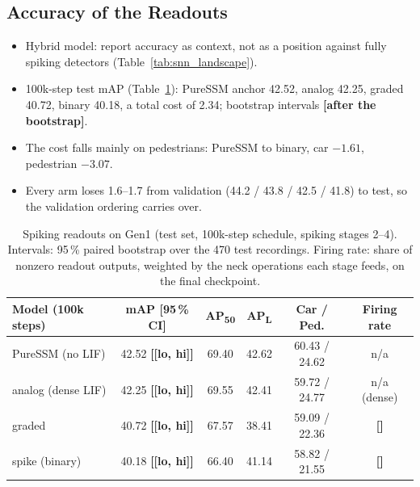 \documentclass[11pt, a4paper]{report}
\newcommand{\res}[1]{{\color{red}\textbf{[#1]}}}
\begin{document}
\subsection{Accuracy of the Readouts}
\label{subsec:spk_accuracy}
\begin{itemize}
  \item Hybrid model: report accuracy as context, not as a position against fully spiking detectors (Table~\ref{tab:snn_landscape}).
  \item 100k-step test mAP (Table~\ref{tab:spiking_ablation}): PureSSM anchor 42.52, analog 42.25, graded 40.72, binary 40.18, a total cost of 2.34; bootstrap intervals \res{after the bootstrap}.
  \item The cost falls mainly on pedestrians: PureSSM to binary, car $-1.61$, pedestrian $-3.07$.
  \item Every arm loses 1.6--1.7 from validation (44.2 / 43.8 / 42.5 / 41.8) to test, so the validation ordering carries over.
\end{itemize}
\begin{table}[htbp]
\centering
\caption{Spiking readouts on Gen1 (test set, 100k-step schedule, spiking stages 2--4). Intervals: 95\,\%
paired bootstrap over the 470 test recordings. Firing rate: share of nonzero readout outputs, weighted by the
neck operations each stage feeds, on the final checkpoint.}
\label{tab:spiking_ablation}
\begin{tabular}{lccccc}
\toprule
\textbf{Model (100k steps)} & \textbf{mAP [95\,\% CI]} & \textbf{AP\textsubscript{50}} & \textbf{AP\textsubscript{L}} & \textbf{Car / Ped.} & \textbf{Firing rate} \\
\midrule
PureSSM (no LIF)   & 42.52 \res{[lo, hi]} & 69.40 & 42.62 & 60.43 / 24.62 & n/a \\
analog (dense LIF) & 42.25 \res{[lo, hi]} & 69.55 & 42.41 & 59.72 / 24.77 & n/a (dense) \\
graded             & 40.72 \res{[lo, hi]} & 67.57 & 38.41 & 59.09 / 22.36 & \res{} \\
spike (binary)     & 40.18 \res{[lo, hi]} & 66.40 & 41.14 & 58.82 / 21.55 & \res{} \\
\bottomrule
\end{tabular}
\end{table}
\end{document}

